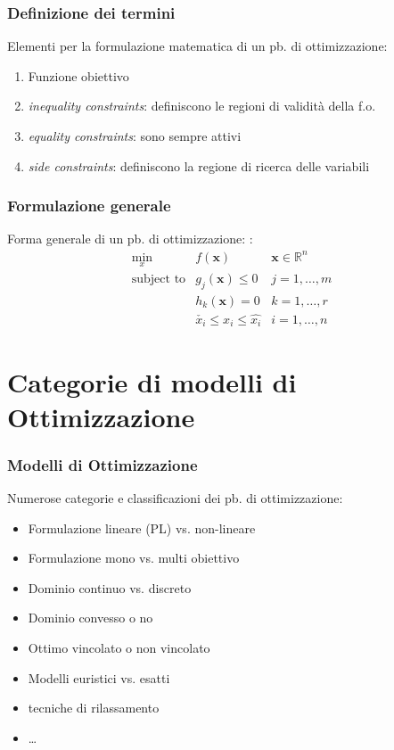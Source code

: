 \documentclass{beamer}
\begin{document}
\begin{frame}
	\frametitle{Definizione dei termini}
	Elementi per la formulazione matematica di un pb. di ottimizzazione:
	\\
	\begin{enumerate}
		\item Funzione obiettivo
		\item \textit{inequality constraints}: definiscono le regioni di validit\`{a} della f.o.
		\item \textit{equality constraints}: sono sempre attivi
		\item \textit{side constraints}: definiscono la regione di ricerca delle variabili
	\end{enumerate}
\end{frame}


\begin{frame}
\frametitle{Formulazione generale}
 Forma generale di un pb. di ottimizzazione: \cite{vanderplaats1984numerical}:
	\begin{eqnarray}
	\underset{x}{\text{min}} & f(\mathbf{x}) & \mathbf{x} \in \mathbb{R}^n \\
	\text{subject to} & g_j(\mathbf{x}) \leq 0 & j=1,\ldots, m \\
	& h_k(\mathbf{x}) = 0 & k=1,\ldots, r \\
	&  \check{x_i} \leq x_i \leq \hat{x_i}  & i=1,\ldots, n
	\end{eqnarray}
\end{frame}






\section{Categorie di modelli di Ottimizzazione}


\begin{frame}
	\frametitle{Modelli di Ottimizzazione}
	Numerose categorie e classificazioni dei pb. di ottimizzazione:
	\\
	\begin{itemize}
		\item Formulazione lineare (PL) vs. non-lineare \cite{vanderbei2014linear}
		\item Formulazione mono vs. multi obiettivo \cite{desideri2010}
		\item Dominio continuo vs. discreto
		\item Dominio convesso o no \cite{boyd2004convex}
		\item Ottimo vincolato o non vincolato 
		\item Modelli euristici vs. esatti
		\item tecniche di rilassamento
		\item \ldots
	\end{itemize}
\end{frame}
\end{document}
